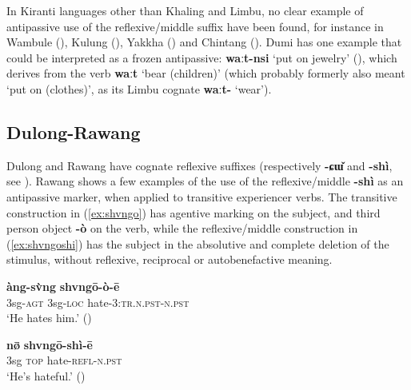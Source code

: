 \documentclass[oneside,a4paper,11pt]{article}
\newcommand{\ipa}[1]{{\phon\textbf{#1}}}
\begin{document}
In  Kiranti languages other than Khaling and Limbu, no clear example of antipassive use of the reflexive/middle suffix have been found, for instance in Wambule (\citealt[305-6]{opgenort04wambule}), Kulung (\citealt[61-2]{tolsma06kulung}), Yakkha (\citealt[307-9]{schackow15yakkha}) and Chintang (\citealt{schikowski15flexible}). Dumi has one example that could be interpreted as a frozen antipassive:  \ipa{waːt-nsi} `put on jewelry' (\citealt[125-9]{driem93dumi}), which derives from the verb \ipa{waːt} `bear (children)' (which probably formerly also meant `put on (clothes)', as its Limbu cognate \ipa{waːt-} `wear').

\subsection{Dulong-Rawang} \label{sec:rawang}
Dulong and Rawang have cognate reflexive suffixes (respectively \ipa{-ɕɯ̌} and \ipa{-shì}, see \citealt{lapolla04reflexive}). Rawang shows a few examples of the use of the reflexive/middle \ipa{-shì} as an antipassive marker, when applied to transitive experiencer verbs. The transitive construction in (\ref{ex:shvngo}) has agentive marking on the subject, and third person object \ipa{-ò} on the verb, while the reflexive/middle construction in (\ref{ex:shvngoshi}) has the subject in the absolutive and complete deletion of the stimulus, without reflexive, reciprocal or autobenefactive meaning.

\begin{exe}
\ex  \label{ex:shvngo}
\gll \ipa{à:ng-i} \ipa{àng-sv̀ng} \ipa{shvngō-ò-ē} \\
3sg-\textsc{agt} 3sg-\textsc{loc} hate-\textsc{3:tr.n.pst-n.pst} \\
\glt `He hates him.' (\citealt[294]{lapolla01valency})
\end{exe}

\begin{exe}
\ex  \label{ex:shvngoshi}
\gll  \ipa{àng} \ipa{nø̄} \ipa{shvngō-shì-ē} \\
3sg \textsc{top} hate-\textsc{refl-n.pst} \\
\glt `He's hateful.' (\citealt[294]{lapolla01valency})
 \end{exe}
 
\end{document}
